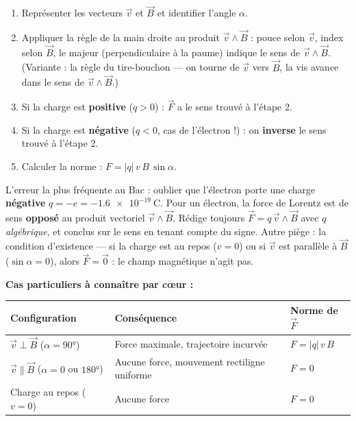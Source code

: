 \documentclass[11pt]{article}
\begin{document}
\begin{methode}
\begin{enumerate}
\item Représenter les vecteurs $\vec{v}$ et $\vec{B}$ et identifier l'angle $\alpha$.
\item Appliquer la règle de la main droite au produit $\vec{v} \wedge \vec{B}$ : pouce selon $\vec{v}$, index selon $\vec{B}$, le majeur (perpendiculaire à la paume) indique le sens de $\vec{v} \wedge \vec{B}$. (Variante : la règle du tire-bouchon — on tourne de $\vec{v}$ vers $\vec{B}$, la vis avance dans le sens de $\vec{v} \wedge \vec{B}$.)
\item Si la charge est \textbf{positive} ($q>0$) : $\vec{F}$ a le sens trouvé à l'étape 2.
\item Si la charge est \textbf{négative} ($q<0$, cas de l'électron !) : on \textbf{inverse} le sens trouvé à l'étape 2.
\item Calculer la norme : $F = |q|\,v\,B\,\sin\alpha$.
\end{enumerate}
\end{methode}

\begin{attention}
L'erreur la plus fréquente au Bac : oublier que l'électron porte une charge \textbf{négative} $q = -e = \num{-1,6e-19}\ \mathrm{C}$. Pour un électron, la force de Lorentz est de sens \textbf{opposé} au produit vectoriel $\vec{v} \wedge \vec{B}$. Rédige toujours $\vec{F} = q\,\vec{v}\wedge\vec{B}$ avec $q$ \emph{algébrique}, et conclus sur le sens en tenant compte du signe. Autre piège : la condition d'existence — si la charge est au repos ($v = 0$) ou si $\vec{v}$ est parallèle à $\vec{B}$ ($\sin\alpha = 0$), alors $\vec{F} = \vec{0}$ : le champ magnétique n'agit pas.
\end{attention}

\textbf{Cas particuliers à connaître par cœur :}
\begin{center}
\begin{tabularx}{\linewidth}{|l|X|X|}
\hline
\rowcolor{popblueL} \textbf{Configuration} & \textbf{Conséquence} & \textbf{Norme de $\vec{F}$} \\
\hline
$\vec{v} \perp \vec{B}$ ($\alpha = 90°$) & Force maximale, trajectoire incurvée & $F = |q|\,v\,B$ \\
\hline
$\vec{v} \parallel \vec{B}$ ($\alpha = 0$ ou $180°$) & Aucune force, mouvement rectiligne uniforme & $F = 0$ \\
\hline
Charge au repos ($v = 0$) & Aucune force & $F = 0$ \\
\hline
\end{tabularx}
\end{center}
\end{document}

